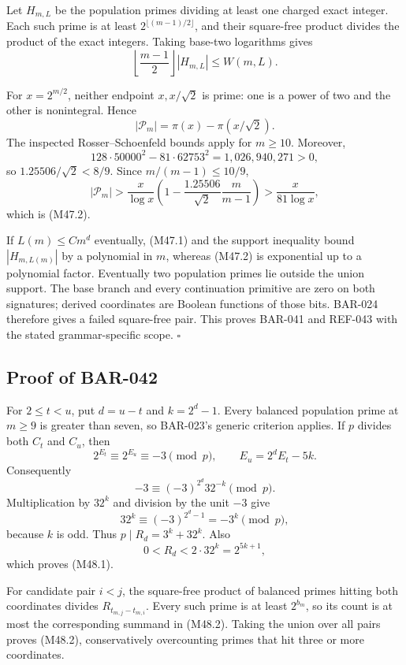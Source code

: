 \documentclass[11pt]{article}
\begin{document}
Let \(H_{m,L}\) be the population primes dividing at least one charged exact
integer. Each such prime is at least
\(2^{\lfloor(m-1)/2\rfloor}\), and their square-free product divides the
product of the exact integers. Taking base-two logarithms gives
\[
\left\lfloor\frac{m-1}{2}\right\rfloor |H_{m,L}|
\le W(m,L).
\]

For \(x=2^{m/2}\), neither endpoint \(x,x/\sqrt2\) is prime: one is a power
of two and the other is nonintegral. Hence
\[
|\mathcal P_m|=\pi(x)-\pi(x/\sqrt2).
\]
The inspected Rosser--Schoenfeld bounds apply for \(m\ge10\). Moreover,
\[
128\cdot50000^2-81\cdot62753^2
=1{,}026{,}940{,}271>0,
\]
so \(1.25506/\sqrt2<8/9\). Since \(m/(m-1)\le10/9\),
\[
|\mathcal P_m|
>\frac{x}{\log x}
\left(1-\frac{1.25506}{\sqrt2}\frac{m}{m-1}\right)
>\frac{x}{81\log x},
\]
which is (M47.2).

If \(L(m)\le Cm^d\) eventually, (M47.1) and the support inequality bound
\(|H_{m,L(m)}|\) by a polynomial in \(m\), whereas (M47.2) is exponential up
to a polynomial factor. Eventually two population primes lie outside the
union support. The base branch and every continuation primitive are zero on
both signatures; derived coordinates are Boolean functions of those bits.
BAR-024 therefore gives a failed square-free pair. This proves BAR-041 and
REF-043 with the stated grammar-specific scope. \(\square\)

\subsection{Proof of BAR-042}
\label{proof:BAR-042}

For \(2\le t<u\), put \(d=u-t\) and \(k=2^d-1\). Every balanced population
prime at \(m\ge9\) is greater than seven, so BAR-023's generic criterion
applies. If \(p\) divides both \(C_t\) and \(C_u\), then
\[
2^{E_t}\equiv2^{E_u}\equiv-3\pmod p,
\qquad E_u=2^dE_t-5k.
\]
Consequently
\[
-3\equiv(-3)^{2^d}32^{-k}\pmod p.
\]
Multiplication by \(32^k\) and division by the unit \(-3\) give
\[
32^k\equiv(-3)^{2^d-1}=-3^k\pmod p,
\]
because \(k\) is odd. Thus \(p\mid R_d=3^k+32^k\). Also
\[
0<R_d<2\cdot32^k=2^{5k+1},
\]
which proves (M48.1).

For candidate pair \(i<j\), the square-free product of balanced primes
hitting both coordinates divides \(R_{t_{m,j}-t_{m,i}}\). Every such prime
is at least \(2^{b_m}\), so its count is at most the corresponding summand
in (M48.2). Taking the union over all pairs proves (M48.2), conservatively
overcounting primes that hit three or more coordinates.
\end{document}
